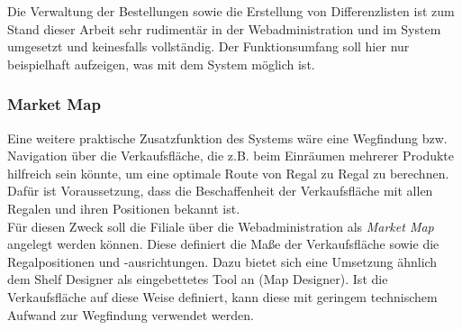 Die Verwaltung der Bestellungen sowie die Erstellung von Differenzlisten ist zum Stand dieser Arbeit sehr rudimentär in der Webadministration und im System umgesetzt und keinesfalls vollständig. Der Funktionsumfang soll hier nur beispielhaft aufzeigen, was mit dem System möglich ist.

\subsubsection{Market Map}
Eine weitere praktische Zusatzfunktion des Systems wäre eine Wegfindung bzw. Navigation über die Verkaufsfläche, die z.B. beim Einräumen mehrerer Produkte hilfreich sein könnte, um eine optimale Route von Regal zu Regal zu berechnen. Dafür ist Voraussetzung, dass die Beschaffenheit der Verkaufsfläche mit allen Regalen und ihren Positionen bekannt ist.\\

Für diesen Zweck soll die Filiale über die Webadministration als \emph{Market Map} angelegt werden können. Diese definiert die Maße der Verkaufsfläche sowie die Regalpositionen und -ausrichtungen. Dazu bietet sich eine Umsetzung ähnlich dem Shelf Designer als eingebettetes Tool an (Map Designer). Ist die Verkaufsfläche auf diese Weise definiert, kann diese mit geringem technischem Aufwand zur Wegfindung verwendet werden.

